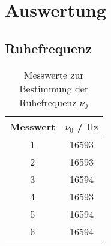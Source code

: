 \section{Auswertung}
\label{sec:Auswertung}

\subsection{Ruhefrequenz}
\begin{table}
	\centering
	\caption{Messwerte zur Bestimmung der Ruhefrequenz $\nu_0$}
	\label{tab:ruhefr}
	\begin{tabular}{cc}
		\toprule
		Messwert & $\nu_0$ / $\si{\hertz}$ \\
		\midrule
		1 & 16593 \\
		2 & 16593 \\
		3 & 16594 \\
		4 & 16593 \\
		5 & 16594 \\
		6 & 16594 \\
		\bottomrule
	\end{tabular}
\end{table}
